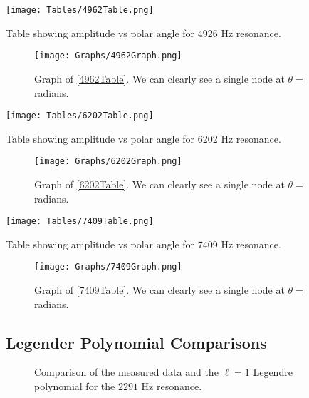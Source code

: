 \begin{multicols}{2}	
	\begin{table}[H]
		\texttt{[image: Tables/4962Table.png]}
		\caption{Table showing amplitude vs polar angle for 4926 Hz resonance.}
		\label{4962Table}		
	\end{table}
	\columnbreak
	\begin{figure}[H]
		\texttt{[image: Graphs/4962Graph.png]}
		\caption{Graph of \cref{4962Table}. We can clearly see a single node at $\theta = $ radians.}
		\label{4962Graph}
	\end{figure}
\end{multicols}


\begin{multicols}{2}	
	\begin{table}[H]
		\texttt{[image: Tables/6202Table.png]}
		\caption{Table showing amplitude vs polar angle for 6202 Hz resonance.}
		\label{6202Table}		
	\end{table}
	\columnbreak
	\begin{figure}[H]
		\texttt{[image: Graphs/6202Graph.png]}
		\caption{Graph of \cref{6202Table}. We can clearly see a single node at $\theta = $ radians.}
		\label{6202Graph}
	\end{figure}
\end{multicols}

\pagebreak

\begin{multicols}{2}	
	\begin{table}[H]
		\texttt{[image: Tables/7409Table.png]}
		\caption{Table showing amplitude vs polar angle for 7409 Hz resonance.}
		\label{7409Table}		
	\end{table}
	\columnbreak
	\begin{figure}[H]
		\texttt{[image: Graphs/7409Graph.png]}
		\caption{Graph of \cref{7409Table}. We can clearly see a single node at $\theta = $ radians.}
		\label{7409Graph}
	\end{figure}
\end{multicols}


\subsection{Legender Polynomial Comparisons}
\begin{figure}[H]
	\centering
	\qquad
	\caption{Comparison of the measured data and the $\ell=1$ Legendre polynomial for the $2291$ Hz resonance.}
	\label{legendre1}
\end{figure}

